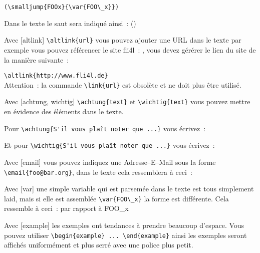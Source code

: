 \begin{description}
\begin{verbatim}
(\smalljump{FOOx}{\var{FOO\_x}})
\end{verbatim}

Dans le texte le saut sera indiqué ainsi~: ()

\item Avec [altlink] \verb*?\altlink{url}? vous pouvez ajouter une URL dans le
  texte par exemple vous pouvez référencer le site fli4l~:
  , vous devez gérérer le lien du site de la
  manière suivante~:

  \verb*?\altlink{http://www.fli4l.de}?\\
  Attention~: la commande \verb*?\link{url}? est obsolète et ne doit plus être
  utilisé.

\item Avec [achtung, wichtig] \verb*?\achtung{text}? et \verb*?\wichtig{text}? 
  vous pouvez mettre en évidence des éléments dans le texte.

  Pour \verb*?\achtung{S'il vous plaît noter que ...}? vous écrivez~:


  Et pour \verb*?\wichtig{S'il vous plaît noter que ...}? vous écrivez~:


\item Avec [email] vous pouvez indiquez une Adresse--E--Mail sous la forme
  \verb*?\email{foo@bar.org}?, dans le texte cela ressemblera à ceci~:


\item Avec [var] une simple variable qui est parsemée dans le texte est tous
simplement laid, mais si elle est assemblée \verb*?\var{FOO\_x}? la forme est
différente. Cela ressemble à ceci~:  par rapport à FOO\_x

\item Avec [example] les exemples ont tendances à prendre beaucoup d'espace.
  Vous pouvez utiliser \verb*?\begin{example} ... \end{example}? ainsi les
  exemples seront affichés uniformément et plus serré avec une police plus petit.
\end{description}

